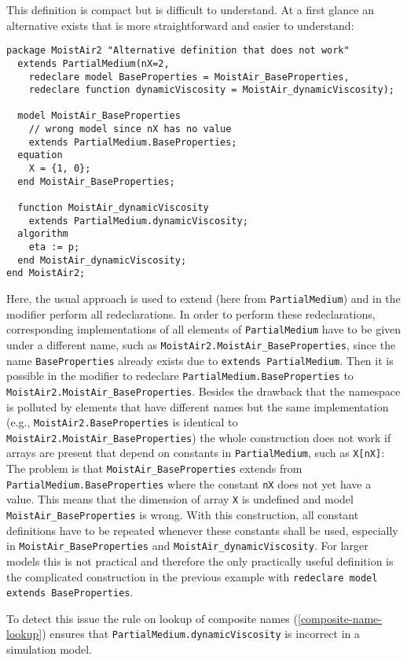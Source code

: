 \begin{nonnormative}
This definition is compact but is difficult to understand. At a
first glance an alternative exists that is more straightforward and
easier to understand:
\begin{lstlisting}[language=modelica]
package MoistAir2 "Alternative definition that does not work"
  extends PartialMedium(nX=2,
    redeclare model BaseProperties = MoistAir_BaseProperties,
    redeclare function dynamicViscosity = MoistAir_dynamicViscosity);

  model MoistAir_BaseProperties
    // wrong model since nX has no value
    extends PartialMedium.BaseProperties;
  equation
    X = {1, 0};
  end MoistAir_BaseProperties;

  function MoistAir_dynamicViscosity
    extends PartialMedium.dynamicViscosity;
  algorithm
    eta := p;
  end MoistAir_dynamicViscosity;
end MoistAir2;
\end{lstlisting}

Here, the usual approach is used to extend (here from \lstinline!PartialMedium!) and in the modifier perform all redeclarations.
In order to perform these redeclarations, corresponding implementations of all elements of \lstinline!PartialMedium! have to be given under a different name, such as \lstinline!MoistAir2.MoistAir_BaseProperties!, since the name \lstinline!BaseProperties! already exists due to \lstinline!extends PartialMedium!.
Then it is possible in the modifier to redeclare \lstinline!PartialMedium.BaseProperties! to \lstinline!MoistAir2.MoistAir_BaseProperties!.
Besides the drawback that the namespace is polluted by elements that have different names but the same implementation (e.g., \lstinline!MoistAir2.BaseProperties! is identical to \lstinline!MoistAir2.MoistAir_BaseProperties!) the whole construction does not work if arrays are present that depend on constants in \lstinline!PartialMedium!, such as \lstinline!X[nX]!:
The problem is that \lstinline!MoistAir_BaseProperties! extends from \lstinline!PartialMedium.BaseProperties! where the constant \lstinline!nX! does not yet have a value.
This means that the dimension of array \lstinline!X! is undefined and model \lstinline!MoistAir_BaseProperties! is wrong.
With this construction, all constant definitions have to be repeated whenever these constants shall be used, especially in \lstinline!MoistAir_BaseProperties! and \lstinline!MoistAir_dynamicViscosity!.
For larger models this is not practical and therefore the only practically useful definition is the complicated construction in the previous example with \lstinline!redeclare model extends BaseProperties!.

To detect this issue the rule on lookup of composite names (\cref{composite-name-lookup}) ensures that \lstinline!PartialMedium.dynamicViscosity! is incorrect in a simulation model.
\end{nonnormative}

